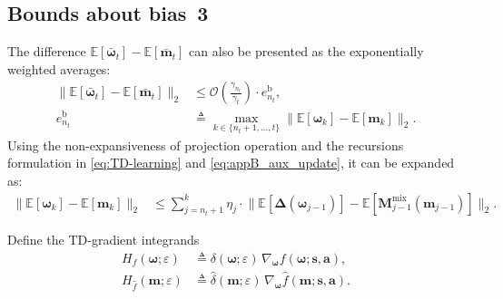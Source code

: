 \documentclass{IEEEtran}
\begin{document}
\subsection{Bounds about bias~3}
The difference $\mathbb{E}[\bar{\boldsymbol{\omega}}_{t}]-\mathbb{E}[\bar{\boldsymbol{m}}_{t}]$ can also be presented as the exponentially weighted averages: 
\begin{equation}
\begin{aligned}
\bigl\|\mathbb{E}[\bar{\boldsymbol{\omega}}_{t}]-\mathbb{E}[\bar{\boldsymbol{m}}_{t}]\bigr\|_2
&\le \mathcal{O}\!\left(\frac{\gamma_{n_t}}{\gamma_t}\right)\cdot e_{n_t}^{\mathrm{b}},\\
e_{n_t}^{\mathrm{b}}
&\triangleq \max_{k\in\{n_t+1,\ldots,t\}}\bigl\|\mathbb{E}[\boldsymbol{\omega}_{k}]-\mathbb{E}[\boldsymbol{m}_{k}]\bigr\|_2.
\end{aligned}
\label{eq:appB_bias3_reduce}
\end{equation}
Using the non-expansiveness of projection operation and the recursions formulation in \eqref{eq:TD-learning} and \eqref{eq:appB_aux_update}, it can be expanded as: 
\begin{equation}
\begin{aligned}
\bigl\|\mathbb{E}[\boldsymbol{\omega}_{k}]-\mathbb{E}[\boldsymbol{m}_{k}]\bigr\|_2
&\le \sum_{j=n_t+1}^{k}\eta_j\cdot\bigl\|\mathbb{E}[\boldsymbol{\Delta}(\boldsymbol{\omega}_{j-1})]
-\mathbb{E}[\boldsymbol{M}^{\mathrm{mix}}_{j-1}(\boldsymbol{m}_{j-1})]\bigr\|_2.
\end{aligned}
\label{eq:appB_bias3_sumgrad}
\end{equation}

Define the TD-gradient integrands
\begin{equation}
\begin{aligned}
H_f(\boldsymbol{\omega};\varepsilon)
&\triangleq \delta(\boldsymbol{\omega};\varepsilon)\,
\nabla_{\boldsymbol{\omega}}f(\boldsymbol{\omega};\boldsymbol{s},\boldsymbol{a}),\\
H_{\hat f}(\boldsymbol{m};\varepsilon)
&\triangleq \hat\delta(\boldsymbol{m};\varepsilon)\,
\nabla_{\boldsymbol{\omega}}\hat f(\boldsymbol{m};\boldsymbol{s},\boldsymbol{a}).
\end{aligned}
\end{equation}
\end{document}
